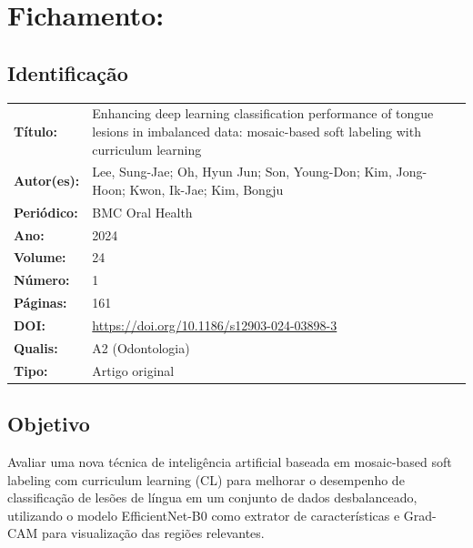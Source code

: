 \section{Fichamento: }

\subsection{Identificação}
\begin{tabular}{ll}
\textbf{Título:} & Enhancing deep learning classification performance of tongue
lesions in imbalanced data: mosaic-based soft labeling with curriculum learning \\
\textbf{Autor(es):} & Lee, Sung-Jae; Oh, Hyun Jun; Son, Young-Don; Kim, Jong-Hoon;
Kwon, Ik-Jae; Kim, Bongju \\
\textbf{Periódico:} & BMC Oral Health \\
\textbf{Ano:} & 2024 \\
\textbf{Volume:} & 24 \\
\textbf{Número:} & 1 \\
\textbf{Páginas:} & 161 \\
\textbf{DOI:} & \url{https://doi.org/10.1186/s12903-024-03898-3} \\
\textbf{Qualis:} & A2 (Odontologia) \\
\textbf{Tipo:} & Artigo original \\
\end{tabular}

\subsection{Objetivo}
Avaliar uma nova técnica de inteligência artificial baseada em mosaic-based soft
labeling com curriculum learning (CL) para melhorar o desempenho de classificação
de lesões de língua em um conjunto de dados desbalanceado, utilizando o modelo
EfficientNet-B0 como extrator de características e Grad-CAM para visualização das
regiões relevantes.

